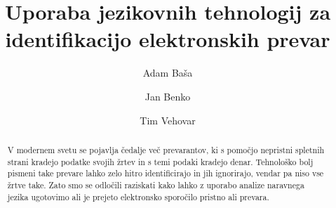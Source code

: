 \documentclass[sigconf,nonacm]{acmart}
\begin{document}
\title{Uporaba jezikovnih tehnologij za identifikacijo elektronskih prevar}


\author{Adam Baša}

\author{Jan Benko}

\author{Tim Vehovar}

\begin{abstract}
   V modernem svetu se pojavlja čedalje več prevarantov, ki s pomočjo nepristni spletnih strani kradejo podatke svojih žrtev in s temi podaki kradejo denar. Tehnološko bolj pismeni take prevare lahko zelo hitro identificirajo in jih ignorirajo, vendar pa niso vse žrtve take. Zato smo se odločili raziskati kako lahko z uporabo analize naravnega jezika ugotovimo ali je prejeto elektronsko sporočilo pristno ali prevara. 
\end{abstract}

\end{document}
